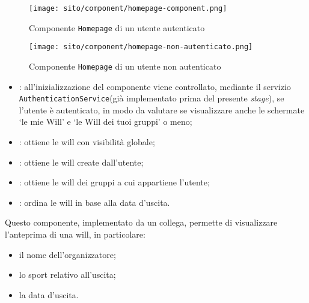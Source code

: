 \begin{figure}[H]

    \centerline{\texttt{[image: sito/component/homepage-component.png]}}
    \caption{Componente \texttt{Homepage} di un utente autenticato}
\end{figure}

\begin{figure}[H]

    \centerline{\texttt{[image: sito/component/homepage-non-autenticato.png]}}
    \caption{Componente \texttt{Homepage} di un utente non autenticato}
\end{figure}


\begin{itemize}
    \item {}: all'inizializzazione del componente viene
          controllato, mediante il servizio \texttt{AuthenticationService}(già
          implementato prima del presente \textit{stage}), se l'utente è
          autenticato, in modo da valutare se visualizzare anche le schermate
          \enquote*{le mie Will} e \enquote*{le Will dei tuoi gruppi} o meno;
    \item {}: ottiene le \gls{will} con
          visibilità globale;
    \item {}: ottiene le \gls{will} create dall'utente;
    \item {}: ottiene le \gls{will} dei gruppi a cui
          appartiene l'utente;
    \item {}: ordina le \gls{will} in base alla data d'uscita.
\end{itemize}

\label{par:WillCard}
Questo componente, implementato da un collega, permette di visualizzare
l'anteprima di una \gls{will}, in particolare:
\begin{itemize}
    \item il nome dell'organizzatore;
    \item lo sport relativo all'uscita;
    \item la data d'uscita.
\end{itemize}

